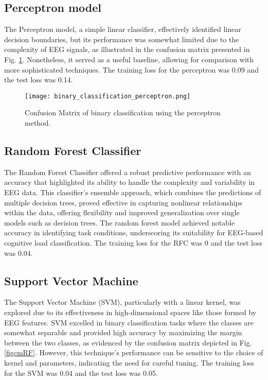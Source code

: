 \documentclass[conference]{IEEEtran}
\begin{document}
\subsection{Perceptron model}

The Perceptron model, a simple linear classifier, effectively identified linear decision boundaries, but its performance was somewhat limited due to the complexity of EEG signals, as illustrated in the confusion matrix presented in Fig. \ref{figcmP}. Nonetheless, it served as a useful baseline, allowing for comparison with more sophisticated techniques.
The training loss for the perceptron was 0.09 and the test loss was 0.14.

\begin{figure}[htbp]
\centerline{\texttt{[image: binary\_classification\_perceptron.png]}}
\caption{Confusion Matrix of binary classification using the perceptron method.}
\label{figcmP}
\end{figure}

\subsection{Random Forest Classifier}

The Random Forest Classifier offered a robust predictive performance with an accuracy that highlighted its ability to handle the complexity and variability in EEG data. This classifier's ensemble approach, which combines the predictions of multiple decision trees, proved effective in capturing nonlinear relationships within the data, offering flexibility and improved generalization over single models such as decision trees. The random forest model achieved notable accuracy in identifying task conditions, underscoring its suitability for EEG-based cognitive load classification.
The training loss for the RFC was 0 and the test loss was 0.04.

\subsection{Support Vector Machine}

The Support Vector Machine (SVM), particularly with a linear kernel, was explored due to its effectiveness in high-dimensional spaces like those formed by EEG features. SVM excelled in binary classification tasks where the classes are somewhat separable and provided high accuracy by maximizing the margin between the two classes, as evidenced by the confusion matrix depicted in Fig. \ref{figcmRF}. However, this technique's performance can be sensitive to the choice of kernel and parameters, indicating the need for careful tuning.
The training loss for the SVM was 0.04 and the test loss was 0.05.
\end{document}
